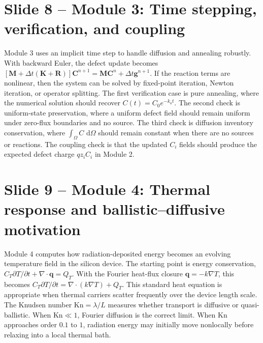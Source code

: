 \documentclass[11pt]{article}
\newcommand{\dd}{\,\mathrm{d}}
\newcommand{\grad}{\nabla}
\newcommand{\divg}{\nabla\!\cdot}
\newcommand{\mat}[1]{\mathbf{#1}}
\newcommand{\vect}[1]{\bm{#1}}
\begin{document}
\section*{Slide 8 -- Module 3: Time stepping, verification, and coupling}
\begin{scriptbox}
Module 3 uses an implicit time step to handle diffusion and annealing robustly. With backward Euler, the defect update becomes \([\mat{M}+\Delta t(\mat{K}+\mat{R})]\vect{C}^{n+1}=\mat{M}\vect{C}^n+\Delta t\vect{g}^{n+1}\). If the reaction terms are nonlinear, then the system can be solved by fixed-point iteration, Newton iteration, or operator splitting. The first verification case is pure annealing, where the numerical solution should recover \(C(t)=C_0e^{-k_at}\). The second check is uniform-state preservation, where a uniform defect field should remain uniform under zero-flux boundaries and no source. The third check is diffusion inventory conservation, where \(\int_\Omega C\,\dd\Omega\) should remain constant when there are no sources or reactions. The coupling check is that the updated \(C_i\) fields should produce the expected defect charge \(qz_iC_i\) in Module 2.
\end{scriptbox}

\section*{Slide 9 -- Module 4: Thermal response and ballistic--diffusive motivation}
\begin{scriptbox}
Module 4 computes how radiation-deposited energy becomes an evolving temperature field in the silicon device. The starting point is energy conservation, \(C_T\partial T/\partial t+\divg\vect{q}=Q_T\). With the Fourier heat-flux closure \(\vect{q}=-k\grad T\), this becomes \(C_T\partial T/\partial t=\divg(k\grad T)+Q_T\). This standard heat equation is appropriate when thermal carriers scatter frequently over the device length scale. The Knudsen number \(\mathrm{Kn}=\lambda/L\) measures whether transport is diffusive or quasi-ballistic. When \(\mathrm{Kn}\ll1\), Fourier diffusion is the correct limit. When \(\mathrm{Kn}\) approaches order \(0.1\) to \(1\), radiation energy may initially move nonlocally before relaxing into a local thermal bath.
\end{scriptbox}
\end{document}
